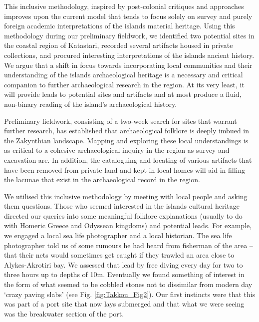 	This inclusive methodology, inspired by post-colonial critiques and approaches improves upon the current model that tends to focus solely on survey and purely foreign academic interpretations of the islands material heritage. Using this methodology during our preliminary fieldwork, we identified two potential sites in the coastal region of Katastari, recorded several artifacts housed in private collections, and procured interesting interpretations of the islands ancient history. We argue that a shift in focus towards incorporating local communities and their understanding of the islands archaeological heritage is a necessary and critical companion to further archaeological research in the region. At its very least, it will provide leads to potential sites and artifacts and at most produce a fluid, non-binary reading of the island’s archaeological history. 
	
	
Preliminary fieldwork, consisting of a two-week search for sites that warrant further research, has established that archaeological folklore is deeply imbued in the Zakynthian landscape. Mapping and exploring these local understandings is as critical to a cohesive archaeological inquiry in the region as survey and excavation are. In addition, the cataloguing and locating of various artifacts that have been removed from private land and kept in local homes will aid in filling the lacunae that exist in the archaeological record in the region.  

We utilised this inclusive methodology by meeting with local people and asking them questions. Those who seemed interested in the islands cultural heritage directed our queries into some meaningful folklore explanations (usually to do with Homeric Greece and Odyssean kingdoms) and potential leads. For example, we engaged a local sea life photographer and a local historian. The sea life photographer told us of some rumours he had heard from fisherman of the area -- that their nets would sometimes get caught if they trawled an area close to Alykes-Akrotiri bay. We assessed that lead by free diving every day for two to three hours up to depths of 10m. Eventually we found something of interest in the form of what seemed to be cobbled stones not to dissimilar from modern day ‘crazy paving slabs’ (see Fig. \ref{fig:Takkou_Fig2}). Our first instincts were that this was part of a port site that now lays submerged and that what we were seeing was the breakwater section of the port. 

